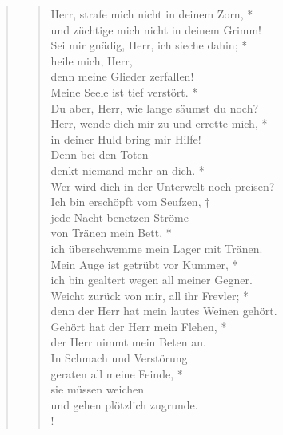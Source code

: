 \begin{quote}
\begin{verse}

\smallskip

Herr, strafe mich nicht in deinem Zorn, *\\
und züchtige mich nicht in deinem Grimm!\\
\vin Sei mir gnädig, Herr, ich sieche dahin; *\\
\vin heile mich, Herr,\\
\vin denn meine Glieder zerfallen!\\
Meine Seele ist tief verstört. *\\
Du aber, Herr, wie lange säumst du noch?\\
\vin Herr, wende dich mir zu und errette mich, *\\
\vin in deiner Huld bring mir Hilfe!\\
Denn bei den Toten\\
denkt niemand mehr an dich. *\\
Wer wird dich in der Unterwelt noch preisen?\\
\vin Ich bin erschöpft vom Seufzen, †\\
\vin jede Nacht benetzen Ströme\\
\vin von Tränen mein Bett, *\\
\vin ich überschwemme mein Lager mit Tränen.\\
Mein Auge ist getrübt vor Kummer, *\\
ich bin gealtert wegen all meiner Gegner.\\
\vin Weicht zurück von mir, all ihr Frevler; *\\
\vin denn der Herr hat mein lautes Weinen gehört.\\
Gehört hat der Herr mein Flehen, *\\
der Herr nimmt mein Beten an.\\
\vin In Schmach und Verstörung\\
\vin geraten all meine Feinde, *\\
\vin sie müssen weichen\\
\vin und gehen plötzlich zugrunde.\\!

\end{verse}
\end{quote}